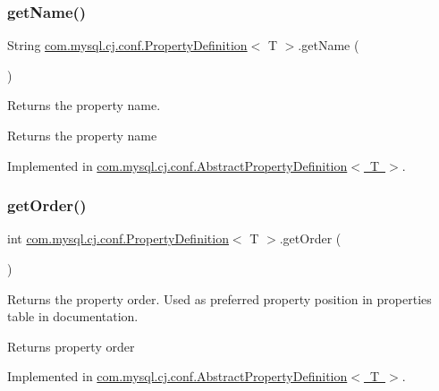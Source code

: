 \subsubsection{\texorpdfstring{get\+Name()}{getName()}}
{\footnotesize\ttfamily String \mbox{\hyperlink{interfacecom_1_1mysql_1_1cj_1_1conf_1_1_property_definition}{com.\+mysql.\+cj.\+conf.\+Property\+Definition}}$<$ T $>$.get\+Name (\begin{DoxyParamCaption}{ }\end{DoxyParamCaption})}

Returns the property name.

\begin{DoxyReturn}{Returns}
the property name 
\end{DoxyReturn}


Implemented in \mbox{\hyperlink{classcom_1_1mysql_1_1cj_1_1conf_1_1_abstract_property_definition_a7b5a7c72c029a0d0b25658f61f2bca01}{com.\+mysql.\+cj.\+conf.\+Abstract\+Property\+Definition$<$ T $>$}}.

\mbox{\label{interfacecom_1_1mysql_1_1cj_1_1conf_1_1_property_definition_a4e40dac46393e75d5b57db4024a5ecf4}} 
\subsubsection{\texorpdfstring{get\+Order()}{getOrder()}}
{\footnotesize\ttfamily int \mbox{\hyperlink{interfacecom_1_1mysql_1_1cj_1_1conf_1_1_property_definition}{com.\+mysql.\+cj.\+conf.\+Property\+Definition}}$<$ T $>$.get\+Order (\begin{DoxyParamCaption}{ }\end{DoxyParamCaption})}

Returns the property order. Used as preferred property position in properties table in documentation.

\begin{DoxyReturn}{Returns}
property order 
\end{DoxyReturn}


Implemented in \mbox{\hyperlink{classcom_1_1mysql_1_1cj_1_1conf_1_1_abstract_property_definition_ace6e9092bf122ffc61f14b1893cb2d22}{com.\+mysql.\+cj.\+conf.\+Abstract\+Property\+Definition$<$ T $>$}}.

